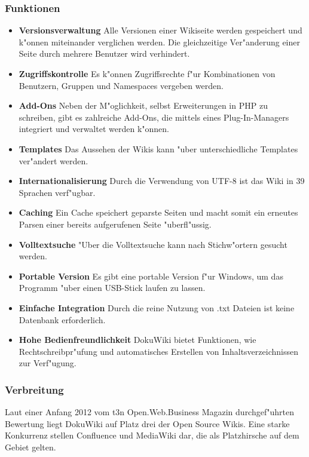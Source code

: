 \subsubsection*{Funktionen}
\begin{itemize}
\item \textbf{Versionsverwaltung}
Alle Versionen einer Wikiseite werden gespeichert und k"onnen miteinander verglichen werden. Die gleichzeitige Ver"anderung einer Seite durch mehrere Benutzer wird verhindert.
\item \textbf{Zugriffskontrolle}
Es k"onnen Zugriffsrechte f"ur Kombinationen von Benutzern, Gruppen und Namespaces vergeben werden.
\item \textbf{Add-Ons}
Neben der M"oglichkeit, selbst Erweiterungen in PHP zu schreiben, gibt es zahlreiche Add-Ons, die mittels eines Plug-In-Managers integriert und verwaltet werden k"onnen.
\item \textbf{Templates}
Das Aussehen der Wikis kann "uber unterschiedliche Templates ver"andert werden.
\item \textbf{Internationalisierung}
Durch die Verwendung von UTF-8 ist das Wiki in 39 Sprachen verf"ugbar.
\item \textbf{Caching}
Ein Cache speichert geparste Seiten und macht somit ein erneutes Parsen einer bereits aufgerufenen Seite "uberfl"ussig.
\item \textbf{Volltextsuche}
"Uber die Volltextsuche kann nach Stichw"ortern gesucht werden.
\item \textbf{Portable Version}
Es gibt eine portable Version f"ur Windows, um das Programm "uber einen USB-Stick laufen zu lassen.
\item \textbf{Einfache Integration}
Durch die reine Nutzung von .txt Dateien ist keine Datenbank erforderlich.
\item \textbf{Hohe Bedienfreundlichkeit}
DokuWiki bietet Funktionen, wie Rechtschreibpr"ufung und automatisches Erstellen von Inhaltsverzeichnissen zur Verf"ugung.
\end{itemize}

\subsubsection*{Verbreitung}
Laut einer Anfang 2012 vom t3n Open.Web.Business Magazin durchgef"uhrten Bewertung liegt DokuWiki auf Platz drei der Open Source Wikis. Eine starke Konkurrenz stellen Confluence und MediaWiki dar, die als Platzhirsche auf dem Gebiet gelten.
